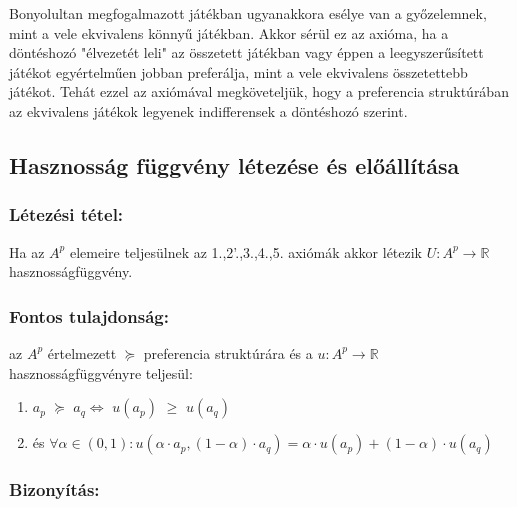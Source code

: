 \documentclass[a4paper,12pt]{article}
\begin{document}
Bonyolultan megfogalmazott játékban ugyanakkora esélye van a győzelemnek, mint a vele ekvivalens könnyű játékban. Akkor sérül ez az axióma, ha a döntéshozó "élvezetét leli" az összetett játékban vagy éppen a leegyszerűsített játékot egyértelműen jobban preferálja, mint a vele ekvivalens összetettebb játékot. Tehát ezzel az axiómával megköveteljük, hogy a preferencia struktúrában az ekvivalens játékok legyenek indifferensek a döntéshozó szerint.


\subsection{Hasznosság függvény létezése és előállítása}

\subsubsection{Létezési tétel: } Ha az $A^p$ elemeire teljesülnek az 1.,2'.,3.,4.,5. axiómák akkor létezik  $U: A^p \rightarrow \mathbb{R}$ hasznosságfüggvény.

\subsubsection{Fontos tulajdonság: } az $A^p$ értelmezett $\succeq$ preferencia struktúrára és a $u: A^p \rightarrow \mathbb{R}$ hasznosságfüggvényre teljesül: 
\begin{enumerate}
\item $a_p$  $\succeq$ $a_q \Leftrightarrow $ $u(a_p)$  $\geq$ $u(a_q)$
\item és $\forall  \alpha \in (0,1): u(\alpha\cdot a_p , (1-\alpha)\cdot a_q ) = \alpha\cdot u(a_p) + (1-\alpha)\cdot u(a_q) $
\end{enumerate}

\subsubsection{Bizonyítás: }
 
\end{document}
